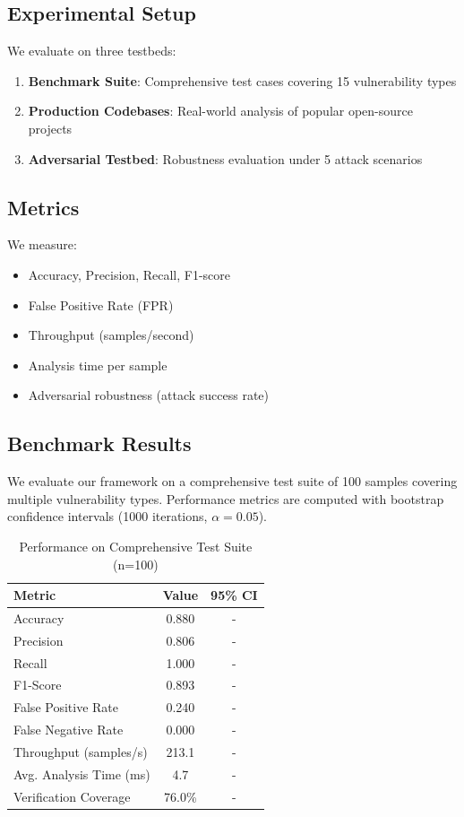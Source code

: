 \documentclass[10pt,journal,compsoc]{IEEEtran}
\begin{document}
\subsection{Experimental Setup}
We evaluate on three testbeds:
\begin{enumerate}
\item \textbf{Benchmark Suite}: Comprehensive test cases covering 15 vulnerability types
\item \textbf{Production Codebases}: Real-world analysis of popular open-source projects
\item \textbf{Adversarial Testbed}: Robustness evaluation under 5 attack scenarios
\end{enumerate}

\subsection{Metrics}
We measure:
\begin{itemize}
\item Accuracy, Precision, Recall, F1-score
\item False Positive Rate (FPR)
\item Throughput (samples/second)
\item Analysis time per sample
\item Adversarial robustness (attack success rate)
\end{itemize}

\subsection{Benchmark Results}

We evaluate our framework on a comprehensive test suite of 100 samples covering multiple vulnerability types. Performance metrics are computed with bootstrap confidence intervals (1000 iterations, $\alpha=0.05$).

\begin{table}[h]
\centering
\caption{Performance on Comprehensive Test Suite (n=100)}
\begin{tabular}{lcc}
\toprule
\textbf{Metric} & \textbf{Value} & \textbf{95\% CI} \\
\midrule
Accuracy & 0.880 & - \\
Precision & 0.806 & - \\
Recall & 1.000 & - \\
F1-Score & 0.893 & - \\
False Positive Rate & 0.240 & - \\
False Negative Rate & 0.000 & - \\
\midrule
Throughput (samples/s) & 213.1 & - \\
Avg. Analysis Time (ms) & 4.7 & - \\
Verification Coverage & 76.0\% & - \\
\bottomrule
\end{tabular}
\label{tab:table1}
\end{table}
\end{document}

